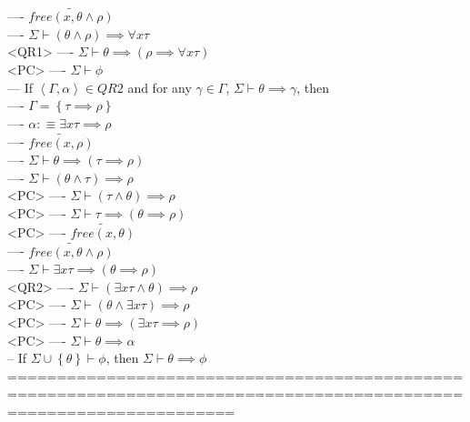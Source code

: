 \documentclass{book}
\newcommand{\is}{:\equiv}
\newcommand{\pnot}[1]{\widetilde{#1}}
\newcommand{\free}[2]{free(#1, #2)}
\newcommand{\set}[1]{\left\{ #1 \right\}}
\newcommand{\seq}[1]{\left\langle #1 \right\rangle}
\begin{document}
				---- $\pnot{\free{x}{\theta \land \rho}}$ \\
				---- $\Sigma \vdash (\theta \land \rho) \implies \forall x \tau$ \\ <QR1>
				---- $\Sigma \vdash \theta \implies (\rho \implies \forall x \tau)$ \\ <PC>
				---- $\Sigma \vdash \phi$ \\
			--- If $\seq{\Gamma, \alpha} \in QR2$ and for any $\gamma \in \Gamma$, $\Sigma \vdash \theta \implies \gamma$, then \\
				---- $\Gamma = \set{\tau \implies \rho}$ \\
				---- $\alpha \is \exists x \tau \implies \rho$ \\
				---- $\pnot{\free{x}{\rho}}$ \\
				---- $\Sigma \vdash \theta \implies (\tau \implies \rho)$ \\
				---- $\Sigma \vdash (\theta \land \tau) \implies \rho$ \\ <PC>
				---- $\Sigma \vdash (\tau \land \theta) \implies \rho$ \\ <PC>
				---- $\Sigma \vdash \tau \implies (\theta \implies \rho)$ \\ <PC>
				---- $\pnot{\free{x}{\theta}}$ \\
				---- $\pnot{\free{x}{\theta \land \rho}}$ \\
				---- $\Sigma \vdash \exists x \tau \implies (\theta \implies \rho)$ \\ <QR2>
				---- $\Sigma \vdash (\exists x \tau \land \theta) \implies \rho$ \\ <PC>
				---- $\Sigma \vdash (\theta \land \exists x \tau) \implies \rho$ \\ <PC>
				---- $\Sigma \vdash \theta \implies (\exists x \tau \implies \rho)$ \\ <PC>
				---- $\Sigma \vdash \theta \implies \alpha$ \\
		-- If $\Sigma \cup \set{\theta} \vdash \phi$, then $\Sigma \vdash \theta \implies \phi$ \\
	===================================================================================================================
\end{document}
